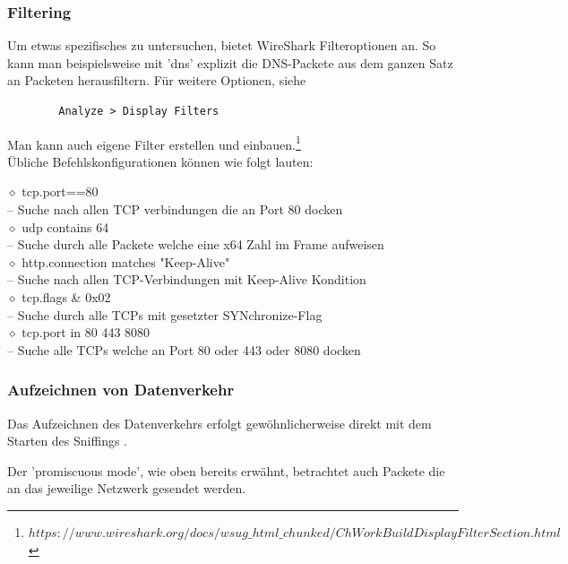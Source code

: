 \documentclass[11pt]{article}
\begin{document}
    \subsubsection{Filtering}
    Um etwas spezifisches zu untersuchen, bietet WireShark Filteroptionen an.
    So kann man beispielsweise mit 'dns' explizit die DNS-Packete aus dem ganzen Satz an Packeten herausfiltern.
    Für weitere Optionen, siehe
    \begin{verbatim}
        Analyze > Display Filters
    \end{verbatim}
    Man kann auch eigene Filter erstellen und einbauen.\footnote[1]{$https://www.wireshark.org/docs/wsug\_html\_chunked/ChWorkBuildDisplayFilterSection.html$}\\
    Übliche Befehlskonfigurationen können wie folgt lauten:
    \begin{addmargin}[1em]{1em}
        $\diamond$ tcp.port==80\\
            -- Suche nach allen TCP verbindungen die an Port 80 docken\\
        $\diamond$ udp contains 64\\
            -- Suche durch alle Packete welche eine x64 Zahl im Frame aufweisen\\
        $\diamond$ http.connection matches "Keep-Alive"\\
            -- Suche nach allen TCP-Verbindungen mit Keep-Alive Kondition\\
        $\diamond$ tcp.flags \& 0x02 \\
            -- Suche durch alle TCPs mit gesetzter SYNchronize-Flag\\
        $\diamond$ tcp.port in {80 443 8080}\\
            -- Suche alle TCPs welche an Port 80 oder 443 oder 8080 docken\\
    \end{addmargin}

    \subsubsection{Aufzeichnen von Datenverkehr}
    Das Aufzeichnen des Datenverkehrs erfolgt gewöhnlicherweise direkt mit dem Starten des Sniffings .

    Der 'promiscuous mode', wie oben bereits erwähnt, betrachtet auch Packete die an das jeweilige Netzwerk gesendet werden.
\end{document}

